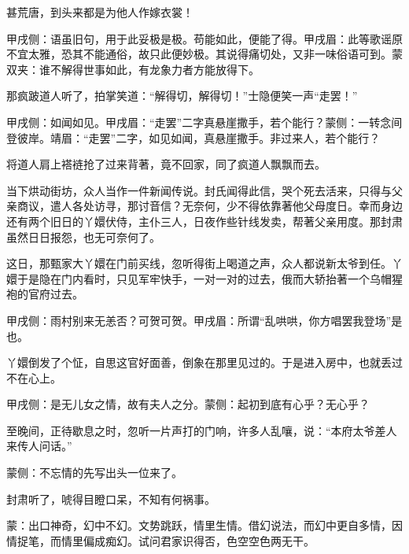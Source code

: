 \begin{poem}
    \begin{pl}甚荒唐，到头来都是为他人作嫁衣裳！\end{pl}\begin{note}甲戌侧：语虽旧句，用于此妥极是极。苟能如此，便能了得。甲戌眉：此等歌谣原不宜太雅，恐其不能通俗，故只此便妙极。其说得痛切处，又非一味俗语可到。蒙双夹：谁不解得世事如此，有龙象力者方能放得下。\end{note}
\end{poem}


\begin{parag}
    那疯跛道人听了，拍掌笑道：“解得切，解得切！”士隐便笑一声“走罢！”\begin{note}甲戌侧：如闻如见。甲戌眉：“走罢”二字真悬崖撒手，若个能行？蒙侧：一转念间登彼岸。靖眉：“走罢”二字，如见如闻，真悬崖撒手。非过来人，若个能行？\end{note}将道人肩上褡裢抢了过来背著，竟不回家，同了疯道人飘飘而去。
\end{parag}


\begin{parag}
    当下烘动街坊，众人当作一件新闻传说。封氏闻得此信，哭个死去活来，只得与父亲商议，遣人各处访寻，那讨音信？无奈何，少不得依靠著他父母度日。幸而身边还有两个旧日的丫嬛伏侍，主仆三人，日夜作些针线发卖，帮著父亲用度。那封肃虽然日日报怨，也无可奈何了。
\end{parag}


\begin{parag}
    这日，那甄家大丫嬛在门前买线，忽听得街上喝道之声，众人都说新太爷到任。丫嬛于是隐在门内看时，只见军牢快手，一对一对的过去，俄而大轿抬著一个乌帽猩袍的官府过去。\begin{note}甲戌侧：雨村别来无恙否？可贺可贺。甲戌眉：所谓“乱哄哄，你方唱罢我登场”是也。\end{note}丫嬛倒发了个怔，自思这官好面善，倒象在那里见过的。于是进入房中，也就丢过不在心上。\begin{note}甲戌侧：是无儿女之情，故有夫人之分。蒙侧：起初到底有心乎？无心乎？\end{note}至晚间，正待歇息之时，忽听一片声打的门响，许多人乱嚷，说：“本府太爷差人来传人问话。”\begin{note}蒙侧：不忘情的先写出头一位来了。\end{note}封肃听了，唬得目瞪口呆，不知有何祸事。
\end{parag}


\begin{parag}
    \begin{note}蒙：出口神奇，幻中不幻。文势跳跃，情里生情。借幻说法，而幻中更自多情，因情捉笔，而情里偏成痴幻。试问君家识得否，色空空色两无干。\end{note}
\end{parag}


